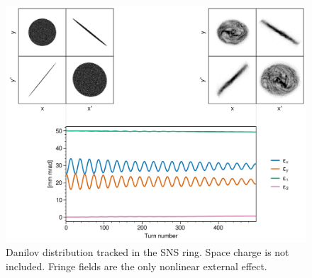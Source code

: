 \begin{figure}[!p]
    \centering
    \includegraphics[width=\textwidth]{Images/chapter3/fringe_spacecharge.png}
    \caption{Danilov distribution tracked in the SNS ring. Space charge is not included. Fringe fields are the only nonlinear external effect.}
    \label{fig:fringe_c}
    \vspace*{3cm}
\end{figure}
